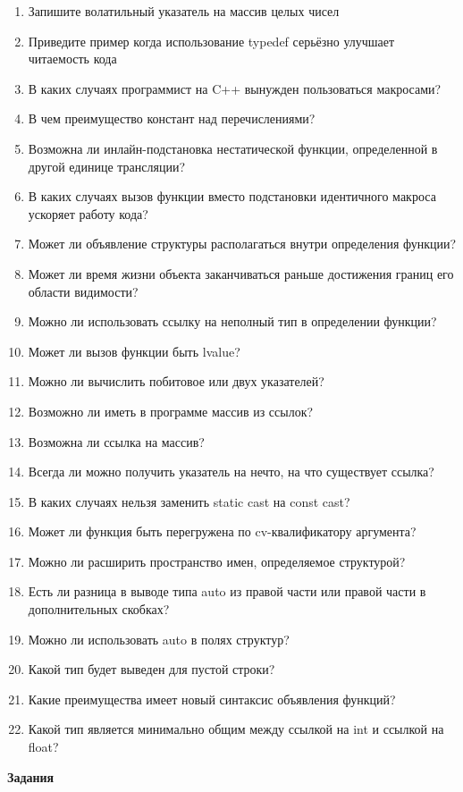 \documentclass[a4paper,12pt,oneside]{article}
\begin{document}
\begin{enumerate}
\item Запишите волатильный указатель на массив целых чисел
\item Приведите пример когда использование typedef серьёзно улучшает читаемость кода
\item В каких случаях программист на C++ вынужден пользоваться макросами?
\item В чем преимущество констант над перечислениями?
\item Возможна ли инлайн-подстановка нестатической функции, определенной в другой единице трансляции?
\item В каких случаях вызов функции вместо подстановки идентичного макроса ускоряет работу кода?
\item Может ли объявление структуры располагаться внутри определения функции?
\item Может ли время жизни объекта заканчиваться раньше достижения границ его области видимости?
\item Можно ли использовать ссылку на неполный тип в определении функции?
\item Может ли вызов функции быть lvalue?
\item Можно ли вычислить побитовое или двух указателей?
\item Возможно ли иметь в программе массив из ссылок?
\item Возможна ли ссылка на массив?
\item Всегда ли можно получить указатель на нечто, на что существует ссылка?
\item В каких случаях нельзя заменить static cast на const cast?
\item Может ли функция быть перегружена по cv-квалификатору аргумента?
\item Можно ли расширить пространство имен, определяемое структурой?
\item Есть ли разница в выводе типа auto из правой части или правой части в дополнительных скобках?
\item Можно ли использовать auto в полях структур?
\item Какой тип будет выведен для пустой строки?
\item Какие преимущества имеет новый синтаксис объявления функций?
\item Какой тип является минимально общим между ссылкой на int и ссылкой на float?
\end{enumerate}

\textbf{Задания} 
\end{document}
